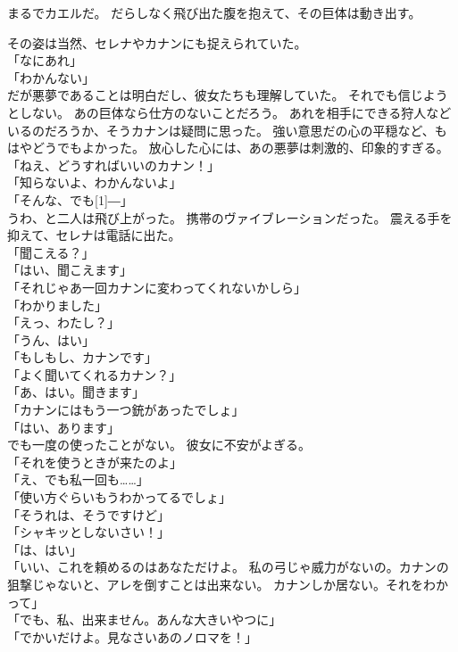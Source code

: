 \documentclass[../IHMain]{subfiles}
\begin{document}
まるでカエルだ。
だらしなく飛び出た腹を抱えて、その巨体は動き出す。

その姿は当然、セレナやカナンにも捉えられていた。\\
「なにあれ」\\
「わかんない」\\
だが悪夢であることは明白だし、彼女たちも理解していた。
それでも信じようとしない。
あの巨体なら仕方のないことだろう。
あれを相手にできる狩人などいるのだろうか、そうカナンは疑問に思った。
強い意思だの心の平穏など、もはやどうでもよかった。
放心した心には、あの悪夢は刺激的、印象的すぎる。\\
「ねえ、どうすればいいのカナン！」\\
「知らないよ、わかんないよ」\\
「そんな、でも\scalebox{3}[1]{―}」\\
うわ、と二人は飛び上がった。
携帯のヴァイブレーションだった。
震える手を抑えて、セレナは電話に出た。\\
「聞こえる？」\\
「はい、聞こえます」\\
「それじゃあ一回カナンに変わってくれないかしら」\\
「わかりました」\\
「えっ、わたし？」\\
「うん、はい」\\
「もしもし、カナンです」\\
「よく聞いてくれるカナン？」\\
「あ、はい。聞きます」\\
「カナンにはもう一つ銃があったでしょ」\\
「はい、あります」\\
でも一度の使ったことがない。
彼女に不安がよぎる。\\
「それを使うときが来たのよ」\\
「え、でも私一回も……」\\
「使い方ぐらいもうわかってるでしょ」\\
「そうれは、そうですけど」\\
「シャキッとしないさい！」\\
「は、はい」\\
「いい、これを頼めるのはあなただけよ。
私の弓じゃ威力がないの。カナンの狙撃じゃないと、アレを倒すことは出来ない。
カナンしか居ない。それをわかって」\\
「でも、私、出来ません。あんな大きいやつに」\\
「でかいだけよ。見なさいあのノロマを！」\\
\end{document}
